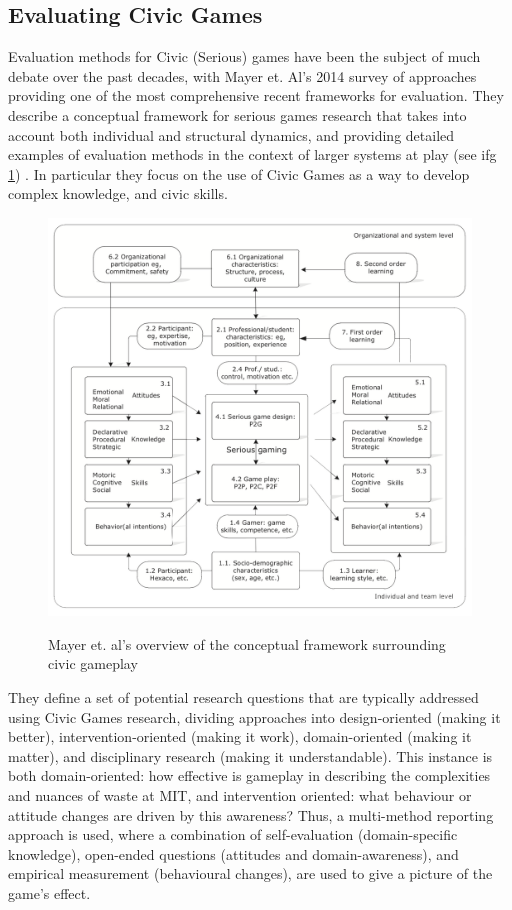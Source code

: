 \documentclass[nofonts,nols,justified,nobib]{tufte-book}
\begin{document}
\subsection*{Evaluating Civic Games}

Evaluation methods for Civic (Serious) games have been the subject of much debate over the past decades, with Mayer et. Al's 2014 survey of approaches providing one of the most comprehensive recent frameworks for evaluation. They describe a conceptual framework for serious games research that takes into account both individual and structural dynamics, and providing detailed examples of evaluation methods in the context of larger systems at play (see ifg \ref{mayer}) \cite{mayer_research_2014}. In particular they focus on the use of Civic Games as a way to develop complex knowledge, and civic skills.

\begin{figure}
  \caption{Mayer et. al's overview of the conceptual framework surrounding civic gameplay \cite{mayer_research_2014}}
  \includegraphics[width=1\linewidth]{img/4/mayer-diagram.png}
  \label{mayer}
\end{figure}

They define a set of potential research questions that are typically addressed using Civic Games research, dividing approaches into design-oriented (making it better), intervention-oriented (making it work), domain-oriented (making it matter), and disciplinary research (making it understandable). This instance is both domain-oriented: how effective is gameplay in describing the complexities and nuances of waste at MIT, and intervention oriented: what behaviour or attitude changes are driven by this awareness? Thus, a multi-method reporting approach is used, where a combination of self-evaluation (domain-specific knowledge), open-ended questions (attitudes and domain-awareness), and empirical measurement (behavioural changes), are used to give a picture of the game's effect.
\end{document}
